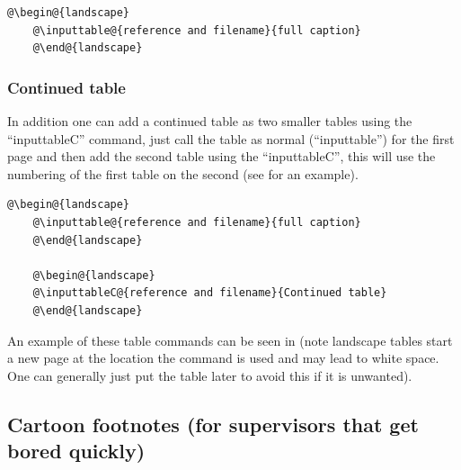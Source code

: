     \begin{lstlisting}[style=base]
    @\begin@{landscape}
    @\inputtable@{reference and filename}{full caption}
    @\end@{landscape}
    \end{lstlisting}

    \subsubsection{Continued table}
        \label{ch1_section_using_this}

    In addition one can add a continued table as two smaller tables using the ``inputtableC'' command, just call the table as normal (``inputtable'') for the first page and then add the second table using the ``inputtableC'', this will use the numbering of the first table on the second (see  for an example).

    \begin{lstlisting}[style=base]
    @\begin@{landscape}
    @\inputtable@{reference and filename}{full caption}
    @\end@{landscape}

    @\begin@{landscape}
    @\inputtableC@{reference and filename}{Continued table}
    @\end@{landscape}
    \end{lstlisting}


    An example of these table commands can be seen in  (note landscape tables start a new page at the location the command is used and may lead to white space. One can generally just put the table later to avoid this if it is unwanted).

    \begin{landscape}
    \end{landscape}
    \begin{landscape}
    \end{landscape}


\subsection{Cartoon footnotes (for supervisors that get bored quickly)}
    \label{ch1_section_footnotes}

